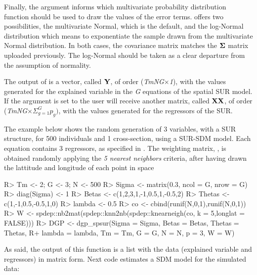 \documentclass[article]{jss}
\begin{document}
Finally, the argument  informs which multivariate probability distribution function should be used to draw the values of the error terms.  offers two possibilities, the multivariate Normal, which is the default, and the log-Normal distribution which means to exponentiate the sample drawn from the multivariate Normal distribution. In both cases, the covariance matrix matches the \({\bf \Sigma}\) matrix uploaded previously. The log-Normal should be taken as a clear departure from the assumption of normality.

The output of  is a vector, called \({\bf Y}\), of order (\emph{TmNG}\(\times\)\emph{1}), with the values generated for the explained variable in the \emph{G} equations of the spatial SUR model. If the argument  is set to  the user will receive another matrix, called \({\bf XX}\), of order (\emph{TmNG}\(\times \Sigma_{g=1}^{G}p_g)\), with the values generated for the regressors of the SUR.

The example below shows the random generation of 3 variables, with a SUR structure, for 500 individuals and 1 cross-section, using a SUR-SDM model. Each equation contains 3 regressors, as specified in . The weighting matrix, , is obtained randomly applying the \emph{5 nearest neighbors} criteria, after having drawn the lattitude and longitude of each point in space

\begin{CodeChunk}

\begin{CodeInput}
R> Tm <- 2; G <- 3; N <- 500
R> Sigma <- matrix(0.3, ncol = G, nrow = G)
R> diag(Sigma) <- 1
R> Betas <- c(1,2,3,1,-1,0.5,1,-0.5,2)
R> Thetas <- c(1,-1,0.5,-0.5,1,0)
R> lambda <- 0.5
R> co <- cbind(runif(N,0,1),runif(N,0,1))
R> W <- spdep::nb2mat(spdep::knn2nb(spdep::knearneigh(co, k = 5,longlat = FALSE)))
R> DGP <- dgp_spsur(Sigma = Sigma, Betas = Betas, Thetas = Thetas,
R+                  lambda = lambda, Tm = Tm, G = G, N = N, p = 3, W = W)
\end{CodeInput}
\end{CodeChunk}

As said, the output of this function is a list with the data (explained variable and regressors) in matrix form. Next code estimates a SDM model for the simulated data:
\end{document}

